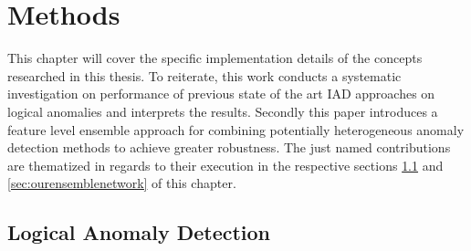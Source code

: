 \chapter{Methods}
\label{chap:method}

This chapter will cover the specific implementation details of the concepts researched in this thesis. To reiterate, this work conducts a systematic investigation on performance of previous state 
of the art IAD approaches on logical anomalies and interprets the results. Secondly this paper introduces a feature level ensemble approach for combining potentially heterogeneous anomaly detection methods to achieve greater robustness. 
The just named contributions 
are thematized in regards to their execution in the respective sections \ref{sec:lcocsurveymethods} and \ref{sec:ourensemblenetwork} of this chapter.


\section{Logical Anomaly Detection}
\label{sec:lcocsurveymethods}

